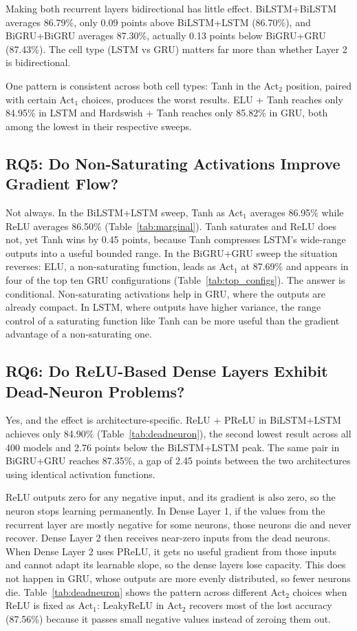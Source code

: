 \documentclass[conference]{IEEEtran}
\begin{document}
Making both recurrent layers bidirectional has little effect.
BiLSTM+BiLSTM averages 86.79\%, only 0.09 points above
BiLSTM+LSTM (86.70\%), and BiGRU+BiGRU averages
87.30\%, actually 0.13 points below BiGRU+GRU (87.43\%).
The cell type (LSTM vs GRU) matters far more than whether
Layer 2 is bidirectional.

One pattern is consistent across both cell types: Tanh in the
Act$_2$ position, paired with certain Act$_1$ choices, produces the
worst results. ELU + Tanh reaches only 84.95\% in LSTM and
Hardswish + Tanh reaches only 85.82\% in GRU, both among
the lowest in their respective sweeps.

\subsection{RQ5: Do Non-Saturating Activations Improve Gradient Flow?}
Not always. In the BiLSTM+LSTM sweep, Tanh as Act$_1$
averages 86.95\% while ReLU averages 86.50\% (Table~\ref{tab:marginal}).
Tanh saturates and ReLU does not, yet Tanh wins by 0.45
points, because Tanh compresses LSTM's wide-range outputs
into a useful bounded range. In the BiGRU+GRU sweep the
situation reverses: ELU, a non-saturating function, leads as Act$_1$
at 87.69\% and appears in four of the top ten GRU configurations
(Table~\ref{tab:top_configs}). The answer is conditional. Non-saturating activations
help in GRU, where the outputs are already compact. In LSTM,
where outputs have higher variance, the range control of a
saturating function like Tanh can be more useful than the
gradient advantage of a non-saturating one.

\subsection{RQ6: Do ReLU-Based Dense Layers Exhibit Dead-Neuron Problems?}

Yes, and the effect is architecture-specific. ReLU + PReLU in
BiLSTM+LSTM achieves only 84.90\% (Table~\ref{tab:deadneuron}), the second
lowest result across all 400 models and 2.76 points below the
BiLSTM+LSTM peak. The same pair in BiGRU+GRU reaches
87.35\%, a gap of 2.45 points between the two architectures
using identical activation functions.

ReLU outputs zero for any negative input, and its gradient
is also zero, so the neuron stops learning permanently. In
Dense Layer 1, if the values from the recurrent layer are
mostly negative for some neurons, those neurons die and never
recover. Dense Layer 2 then receives near-zero inputs from the
dead neurons. When Dense Layer 2 uses PReLU, it gets no
useful gradient from those inputs and cannot adapt its learnable
slope, so the dense layers lose capacity. This does not happen
in GRU, whose outputs are more evenly distributed, so fewer
neurons die. Table~\ref{tab:deadneuron} shows the pattern across different Act$_2$
choices when ReLU is fixed as Act$_1$: LeakyReLU in Act$_2$
recovers most of the lost accuracy (87.56\%) because it passes
small negative values instead of zeroing them out.
\end{document}
